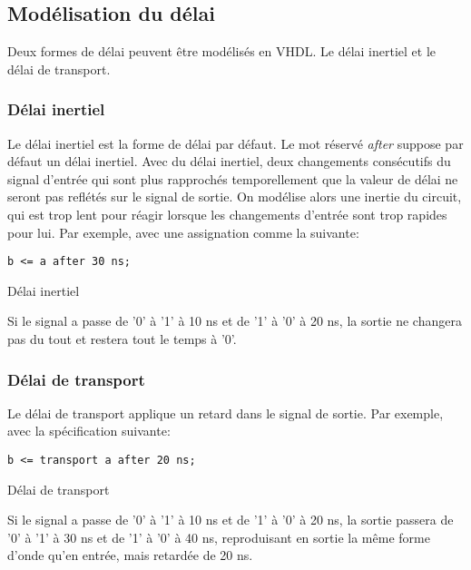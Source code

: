 \documentclass[11pt]{article}
\begin{document}
\subsection{Modélisation du délai}
\label{sec:org7bd12a9}

Deux formes de délai peuvent être modélisés en VHDL. Le délai inertiel
et le délai de transport.

\subsubsection{Délai inertiel}
\label{sec:orgb146023}

Le délai inertiel est la forme de délai par défaut. Le mot réservé
\emph{after} suppose par défaut un délai inertiel. Avec du délai inertiel,
deux changements consécutifs du signal d'entrée qui sont plus
rapprochés temporellement que la valeur de délai ne seront pas
reflétés sur le signal de sortie. On modélise alors une inertie du
circuit, qui est trop lent pour réagir lorsque les changements
d'entrée sont trop rapides pour lui. Par exemple, avec une
assignation comme la suivante:

\begin{listing}[htbp]
\begin{verbatim}
b <= a after 30 ns;
\end{verbatim}
\caption{Délai inertiel}
\end{listing}

Si le signal a passe de '0' à '1' à 10 ns et de '1' à '0' à 20 ns, la
sortie ne changera pas du tout et restera tout le temps à '0'.

\subsubsection{Délai de transport}
\label{sec:org0e68cc0}

Le délai de transport applique un retard dans le signal de sortie. Par
exemple, avec la spécification suivante:

\begin{listing}[htbp]
\begin{verbatim}
b <= transport a after 20 ns;
\end{verbatim}
\caption{Délai de transport}
\end{listing}
Si le signal a passe de '0' à '1' à 10 ns et de '1' à '0' à 20 ns, la
sortie passera de '0' à '1' à 30 ns et de '1' à '0' à 40 ns,
reproduisant en sortie la même forme d'onde qu'en entrée, mais
retardée de 20 ns.
\end{document}
